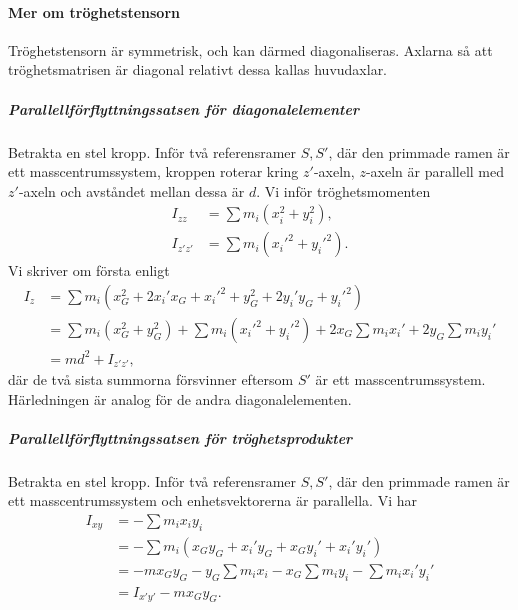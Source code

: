 \paragraph{Mer om tröghetstensorn}
Tröghetstensorn är symmetrisk, och kan därmed diagonaliseras. Axlarna så att tröghetsmatrisen är diagonal relativt dessa kallas huvudaxlar.

\subparagraph{Parallellförflyttningssatsen för diagonalelementer}
Betrakta en stel kropp. Inför två referensramer $S, S'$, där den primmade ramen är ett masscentrumssystem, kroppen roterar kring $z'$-axeln, $z$-axeln är parallell med $z'$-axeln och avståndet mellan dessa är $d$. Vi inför tröghetsmomenten
\begin{align*}
	I_{zz}   &= \sum m_{i}(x_{i}^2 + y_{i}^2), \\
	I_{z'z'} &= \sum m_{i}(x_{i}'^2 + y_{i}'^2).
\end{align*}
Vi skriver om första enligt
\begin{align*}
	I_{z} &= \sum m_{i}(x_{G}^2 + 2x_{i}'x_{G} + x_{i}'^{2} + y_{G}^2 + 2y_{i}'y_{G} + y_{i}'^{2}) \\
	      &= \sum m_{i}(x_{G}^2 + y_{G}^2) + \sum m_{i}(x_{i}'^{2} + y_{i}'^{2}) + 2x_{G}\sum m_{i}x_{i}' + 2y_{G}\sum m_{i}y_{i}' \\
	      &= md^2 + I_{z'z'},
\end{align*}
där de två sista summorna försvinner eftersom $S'$ är ett masscentrumssystem. Härledningen är analog för de andra diagonalelementen.

\subparagraph{Parallellförflyttningssatsen för tröghetsprodukter}
Betrakta en stel kropp. Inför två referensramer $S, S'$, där den primmade ramen är ett masscentrumssystem och enhetsvektorerna är parallella. Vi har
\begin{align*}
	I _{xy} &= -\sum m_{i}x_{i}y_{i} \\
	        &= -\sum m_{i}(x_{G}y_{G} + x_{i}'y_{G} + x_{G}y_{i}' + x_{i}'y_{i}') \\
	        &= -mx_{G}y_{G} - y_{G}\sum m_{i}x_{i} - x_{G}\sum m_{i}y_{i} - \sum m_{i}x_{i}'y_{i}' \\
	        &= I_{x'y'} - mx_{G}y_{G}.
\end{align*}


